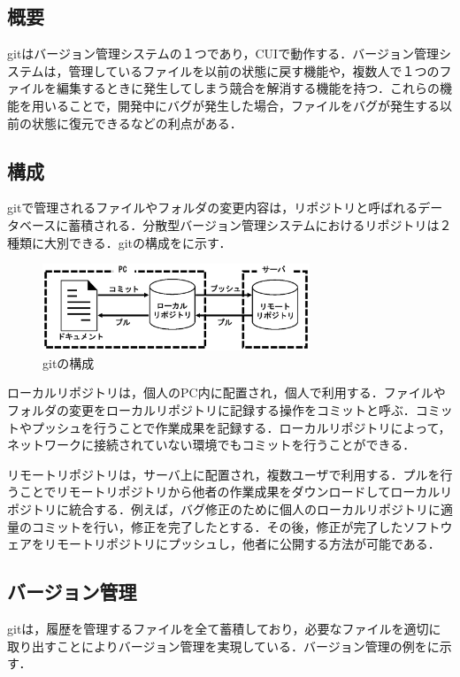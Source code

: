 \documentclass[a4j,9pt,twocolumn]{jsarticle}
\begin{document}
\subsection{概要}
gitはバージョン管理システムの１つであり，CUIで動作する．バージョン管理システムは，管理しているファイルを以前の状態に戻す機能や，複数人で１つのファイルを編集するときに発生してしまう競合を解消する機能を持つ．これらの機能を用いることで，開発中にバグが発生した場合，ファイルをバグが発生する以前の状態に復元できるなどの利点がある\cite{pop}．

\subsection{構成}
gitで管理されるファイルやフォルダの変更内容は，リポジトリと呼ばれるデータベースに蓄積される．分散型バージョン管理システムにおけるリポジトリは２種類に大別できる．gitの構成をに示す．

\begin{figure}[h]
\centering
\includegraphics[width=80mm]{img/git.eps}
\caption{gitの構成}
\label{git}
\end{figure}

ローカルリポジトリは，個人のPC内に配置され，個人で利用する．ファイルやフォルダの変更をローカルリポジトリに記録する操作をコミットと呼ぶ．コミットやプッシュを行うことで作業成果を記録する．ローカルリポジトリによって，ネットワークに接続されていない環境でもコミットを行うことができる．

リモートリポジトリは，サーバ上に配置され，複数ユーザで利用する．プルを行うことでリモートリポジトリから他者の作業成果をダウンロードしてローカルリポジトリに統合する．例えば，バグ修正のために個人のローカルリポジトリに適量のコミットを行い，修正を完了したとする．その後，修正が完了したソフトウェアをリモートリポジトリにプッシュし，他者に公開する方法が可能である．

\subsection{バージョン管理}
gitは，履歴を管理するファイルを全て蓄積しており，必要なファイルを適切に取り出すことによりバージョン管理を実現している．バージョン管理の例をに示す．
\end{document}
